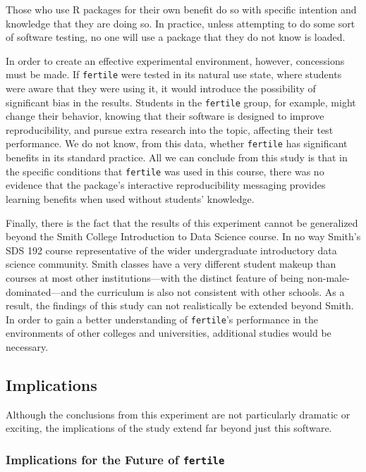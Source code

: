 \documentclass[12pt,twoside]{reedthesis}
\begin{document}
Those who use R packages for their own benefit do so with specific intention and knowledge that they are doing so. In practice, unless attempting to do some sort of software testing, no one will use a package that they do not know is loaded.

In order to create an effective experimental environment, however, concessions must be made. If \texttt{fertile} were tested in its natural use state, where students were aware that they were using it, it would introduce the possibility of significant bias in the results. Students in the \texttt{fertile} group, for example, might change their behavior, knowing that their software is designed to improve reproducibility, and pursue extra research into the topic, affecting their test performance. We do not know, from this data, whether \texttt{fertile} has significant benefits in its standard practice. All we can conclude from this study is that in the specific conditions that \texttt{fertile} was used in this course, there was no evidence that the package's interactive reproducibility messaging provides learning benefits when used without students' knowledge.

Finally, there is the fact that the results of this experiment cannot be generalized beyond the Smith College Introduction to Data Science course. In no way Smith's SDS 192 course representative of the wider undergraduate introductory data science community. Smith classes have a very different student makeup than courses at most other institutions---with the distinct feature of being non-male-dominated---and the curriculum is also not consistent with other schools. As a result, the findings of this study can not realistically be extended beyond Smith. In order to gain a better understanding of \texttt{fertile}'s performance in the environments of other colleges and universities, additional studies would be necessary.

\hypertarget{implications}{%
\subsection{Implications}\label{implications}}

Although the conclusions from this experiment are not particularly dramatic or exciting, the implications of the study extend far beyond just this software.

\hypertarget{implications-for-the-future-of-fertile}{%
\subsubsection{\texorpdfstring{Implications for the Future of \texttt{fertile}}{Implications for the Future of fertile}}\label{implications-for-the-future-of-fertile}}
\end{document}
